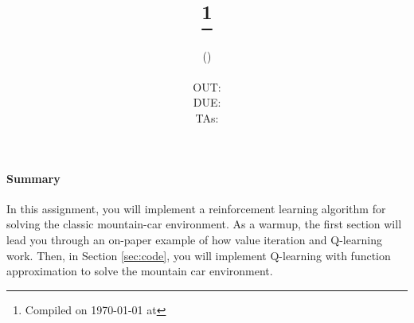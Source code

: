 \documentclass[11pt,addpoints,answers]{exam}
\title{\textsc{\hwNum}\\
\textsc{\hwTopic}
\thanks{Compiled on \today{} at \currenttime{}}\\
\vspace{1em}
} %
\author{\textsc{\large \courseNum{} \courseName{} (\courseSem)}\\
\courseUrl
\vspace{1em}\\
  OUT: \outDate \\
  DUE: \dueDate \\
  TAs: \taNames\\
}
\date{}
\date{}
\begin{document}
\maketitle

\begin{notebox}
\paragraph{Summary} In this assignment, you will implement a reinforcement learning algorithm for solving the classic mountain-car environment. As a warmup, the first section will lead you through an on-paper example of how value iteration and Q-learning work. Then, in Section \ref{sec:code}, you will implement Q-learning with function approximation to solve the mountain car environment.
\end{notebox}\newcommand \maxsubs {10 }
\end{document}
